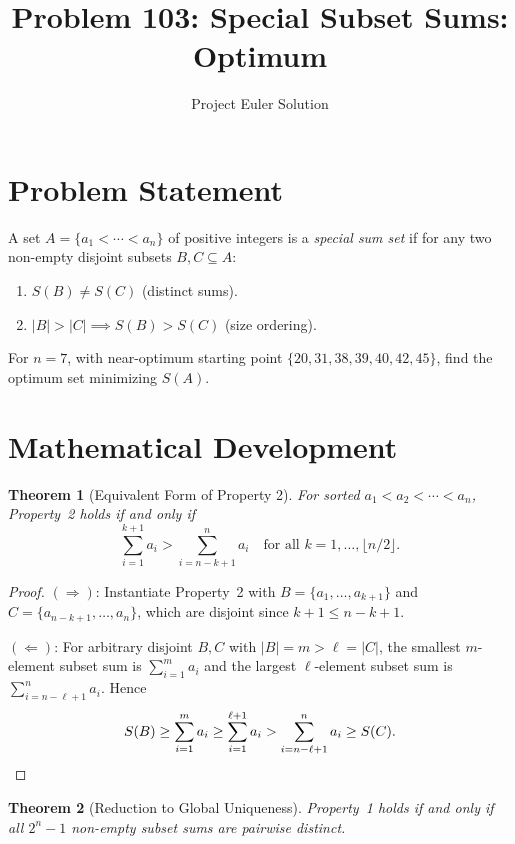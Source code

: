 \documentclass[12pt]{article}
\title{Problem 103: Special Subset Sums: Optimum}
\author{Project Euler Solution}
\date{}
\newtheorem{theorem}{Theorem}
\begin{document}
\maketitle

\section{Problem Statement}

A set $A = \{a_1 < \cdots < a_n\}$ of positive integers is a \emph{special sum set} if for any two non-empty disjoint subsets $B, C \subseteq A$:
\begin{enumerate}
\item $S(B) \neq S(C)$ \quad (distinct sums).
\item $|B| > |C| \implies S(B) > S(C)$ \quad (size ordering).
\end{enumerate}
For $n = 7$, with near-optimum starting point $\{20, 31, 38, 39, 40, 42, 45\}$, find the optimum set minimizing $S(A)$.

\section{Mathematical Development}

\begin{theorem}[Equivalent Form of Property 2]
\label{thm:prop2}
For sorted $a_1 < a_2 < \cdots < a_n$, Property~2 holds if and only if
\[
\sum_{i=1}^{k+1} a_i > \sum_{i=n-k+1}^{n} a_i \quad \text{for all } k = 1, \ldots, \lfloor n/2 \rfloor.
\]
\end{theorem}

\begin{proof}
$(\Rightarrow)$: Instantiate Property~2 with $B = \{a_1, \ldots, a_{k+1}\}$ and $C = \{a_{n-k+1}, \ldots, a_n\}$, which are disjoint since $k+1 \leq n-k+1$.

$(\Leftarrow)$: For arbitrary disjoint $B, C$ with $|B| = m > \ell = |C|$, the smallest $m$-element subset sum is $\sum_{i=1}^m a_i$ and the largest $\ell$-element subset sum is $\sum_{i=n-\ell+1}^n a_i$. Hence
\[
S(B) \geq \sum_{i=1}^m a_i \geq \sum_{i=1}^{\ell+1} a_i > \sum_{i=n-\ell+1}^n a_i \geq S(C). \qedhere
\]
\end{proof}

\begin{theorem}[Reduction to Global Uniqueness]
Property~1 holds if and only if all $2^n - 1$ non-empty subset sums are pairwise distinct.
\end{theorem}
\end{document}
